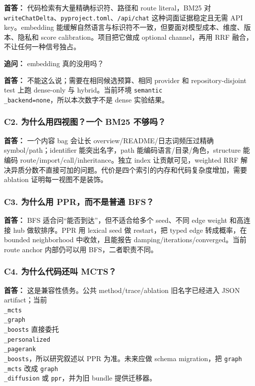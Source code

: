 \documentclass[UTF8,12pt,openany]{ctexbook}
\begin{document}
\textbf{首答：} 代码检索有大量精确标识符、路径和 route literal，BM25 对 \texttt{writeChatDelta}、\texttt{pyproject.toml}、\texttt{/api/chat} 这种词面证据稳定且无需 API key。embedding 能缓解自然语言与标识符不一致，但要面对模型成本、维度、版本、隐私和 score calibration。项目把它做成 optional channel，再用 RRF 融合，不让任何一种信号独占。\par

\textbf{追问：} embedding 真的没用吗？\par

\textbf{首答：} 不能这么说；需要在相同候选预算、相同 provider 和 repository-disjoint test 上跑 dense-only 与 hybrid。当前环境 \texttt{semantic\\_backend=none}，所以本次数字不是 dense 实验结果。\par

\subsubsection{C2. 为什么用四视图？一个 BM25 不够吗？}

\textbf{首答：} 一个内容 bag 会让长 overview/README/日志词频压过精确 symbol/path；identifier 能突出名字，path 能编码语言/目录/角色，structure 能编码 route/import/call/inheritance。独立 index 让贡献可见，weighted RRF 解决异质分数不直接可加的问题。代价是四个索引的内存和代码复杂度增加，需要 ablation 证明每一视图不是装饰。\par

\subsubsection{C3. 为什么用 PPR，而不是普通 BFS？}

\textbf{首答：} BFS 适合问“能否到达”，但不适合给多个 seed、不同 edge weight 和高连接 hub 做软排序。PPR 用 lexical seed 做 restart，把 typed edge 转成概率，在 bounded neighborhood 中收敛，且能报告 damping/iterations/converged。当前 route anchor 内部仍可以用 BFS，二者职责不同。\par

\subsubsection{C4. 为什么代码还叫 MCTS？}

\textbf{首答：} 这是兼容性债务。公共 method/trace/ablation 旧名字已经进入 JSON artifact；当前 \texttt{\\_mcts\\_graph\\_boosts} 直接委托 \texttt{\\_personalized\\_pagerank\\_boosts}，所以研究叙述以 PPR 为准。未来应做 schema migration，把 \texttt{graph\\_mcts} 改成 \texttt{graph\\_diffusion} 或 \texttt{ppr}，并为旧 bundle 提供迁移器。\par
\end{document}

